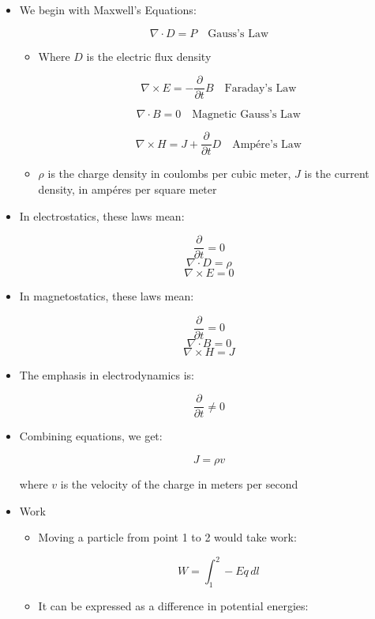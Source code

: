 \begin{itemize}

  \item We begin with Maxwell's Equations:

    $$\nabla\cdot D=P\quad\text{Gauss's Law}$$

    \begin{itemize}

      \item Where $D$ is the electric flux density

    $$\nabla\times E=-\frac{\partial}{\partial t}B\quad\text{Faraday's Law}$$

    $$\nabla\cdot B=0\quad\text{Magnetic Gauss's Law}$$

    $$\nabla\times H=J+\frac{\partial}{\partial t}D\quad\text{Amp\'ere's Law}$$

      \item $\rho$ is the charge density in coulombs per cubic meter, $J$ is the current density, in amp\'eres per square meter

    \end{itemize}

  \item In electrostatics, these laws mean:

    $$\frac{\partial}{\partial t}=0$$
    $$\nabla\cdot D=\rho$$
    $$\nabla\times E=0$$

  \item In magnetostatics, these laws mean:

    $$\frac{\partial}{\partial t}=0$$
    $$\nabla\cdot B=0$$
    $$\nabla\times H=J$$

  \item The emphasis in electrodynamics is:

    $$\frac{\partial}{\partial t}\neq0$$

  \item Combining equations, we get:

    $$J=\rho v$$

    where $v$ is the velocity of the charge in meters per second

  \item Work

    \begin{itemize}

      \item Moving a particle from point 1 to 2 would take work:

        $$W=\int_1^2 -Eq\,dl$$

      \item It can be expressed as a difference in potential energies:


\end{itemize}
\end{itemize}
